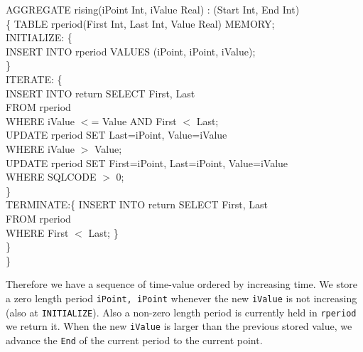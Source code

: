 \begin{codedisplay}
\>AGGREGATE rising(iPoint Int, iValue Real) : (Start Int, End Int)\\
\> \{ TABLE rperiod(First Int, Last Int, Value Real) MEMORY;\\
 \>\> INITIALIZE: \{ \\
\>\> \>\>  INSERT INTO rperiod VALUES (iPoint, iPoint, iValue);\\
 \>\>\> \}\\
\>\>ITERATE: \{ \\
\>\> \>\>            INSERT INTO return SELECT First, Last\\
\>\> \>\>   \>\>          FROM rperiod\\
\>\> \>\>   \>\>         WHERE  iValue $<$= Value AND First $<$ Last;\\
\>\> \>\>        UPDATE rperiod SET Last=iPoint, Value=iValue\\
\>\> \>\>   \>\>           WHERE iValue $>$  Value; \\
\>\> \>\> UPDATE rperiod SET First=iPoint, Last=iPoint, Value=iValue\\
 \>\> \>\>    \>\>              WHERE SQLCODE $>$ 0;\\
  \>\>\> \} \\

 \>\>TERMINATE:\{ INSERT INTO return SELECT First, Last \\
   \>\> \>\>   \>\>           FROM rperiod \\
     \>\> \>\>   \>\>             WHERE   First $<$ Last; \}\\
  \>\>\> \}\\
\> \}
\end{codedisplay}

Therefore we have a sequence of time-value ordered by increasing
time. We store a zero length period {\tt iPoint, iPoint} whenever
the new {\tt iValue} is not increasing (also at
{\tt INITIALIZE}). Also a non-zero length period is currently
held in {\tt rperiod} we  return it.
When the new {\tt iValue} is larger than the
previous stored value, we advance the {\tt End} of the current
period to the current point.
